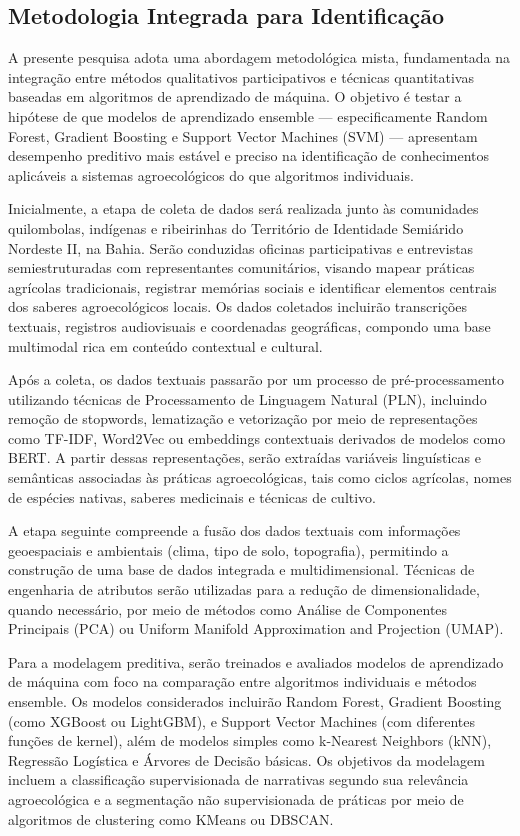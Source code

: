 \subsection{Metodologia Integrada para Identificação}

A presente pesquisa adota uma abordagem metodológica mista, fundamentada na integração entre métodos qualitativos participativos e técnicas quantitativas baseadas em algoritmos de aprendizado de máquina. O objetivo é testar a hipótese de que modelos de aprendizado ensemble — especificamente Random Forest, Gradient Boosting e Support Vector Machines (SVM) — apresentam desempenho preditivo mais estável e preciso na identificação de conhecimentos aplicáveis a sistemas agroecológicos do que algoritmos individuais.

Inicialmente, a etapa de coleta de dados será realizada junto às comunidades quilombolas, indígenas e ribeirinhas do Território de Identidade Semiárido Nordeste II, na Bahia. Serão conduzidas oficinas participativas e entrevistas semiestruturadas com representantes comunitários, visando mapear práticas agrícolas tradicionais, registrar memórias sociais e identificar elementos centrais dos saberes agroecológicos locais. Os dados coletados incluirão transcrições textuais, registros audiovisuais e coordenadas geográficas, compondo uma base multimodal rica em conteúdo contextual e cultural.

Após a coleta, os dados textuais passarão por um processo de pré-processamento utilizando técnicas de Processamento de Linguagem Natural (PLN), incluindo remoção de stopwords, lematização e vetorização por meio de representações como TF-IDF, Word2Vec ou embeddings contextuais derivados de modelos como BERT. A partir dessas representações, serão extraídas variáveis linguísticas e semânticas associadas às práticas agroecológicas, tais como ciclos agrícolas, nomes de espécies nativas, saberes medicinais e técnicas de cultivo.

A etapa seguinte compreende a fusão dos dados textuais com informações geoespaciais e ambientais (clima, tipo de solo, topografia), permitindo a construção de uma base de dados integrada e multidimensional. Técnicas de engenharia de atributos serão utilizadas para a redução de dimensionalidade, quando necessário, por meio de métodos como Análise de Componentes Principais (PCA) ou Uniform Manifold Approximation and Projection (UMAP).

Para a modelagem preditiva, serão treinados e avaliados modelos de aprendizado de máquina com foco na comparação entre algoritmos individuais e métodos ensemble. Os modelos considerados incluirão Random Forest, Gradient Boosting (como XGBoost ou LightGBM), e Support Vector Machines (com diferentes funções de kernel), além de modelos simples como k-Nearest Neighbors (kNN), Regressão Logística e Árvores de Decisão básicas. Os objetivos da modelagem incluem a classificação supervisionada de narrativas segundo sua relevância agroecológica e a segmentação não supervisionada de práticas por meio de algoritmos de clustering como KMeans ou DBSCAN.

